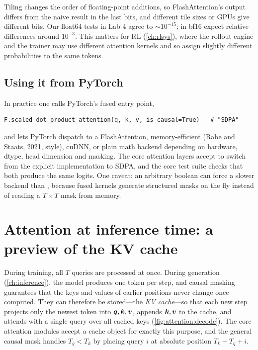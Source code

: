 \begin{pitfall}
Tiling changes the order of floating-point additions, so FlashAttention's output differs from the
naive result in the last bits, and different tile sizes or GPUs give different bits. Our float64
tests in Lab 4 agree to $\sim10^{-15}$; in bf16 expect relative differences around $10^{-3}$. This
matters for RL (\cref{ch:rlsys}), where the rollout engine and the trainer may use different
attention kernels and so assign slightly different probabilities to the same tokens.
\end{pitfall}

\subsection{Using it from PyTorch}
In practice one calls PyTorch's fused entry point,
\begin{lstlisting}[numbers=none]
F.scaled_dot_product_attention(q, k, v, is_causal=True)   # "SDPA"
\end{lstlisting}
\noindent and lets PyTorch dispatch to a FlashAttention, memory-efficient
(Rabe and Staats, 2021, style), cuDNN, or plain math backend depending on hardware, dtype, head
dimension and masking. The core  attention layers accept  to switch
from the explicit implementation to SDPA, and the core test suite checks that both produce the same
logits. One caveat: an arbitrary boolean  can force a slower backend than
, because fused kernels generate structured masks on the fly instead of reading
a $T\times T$ mask from memory.


\section{Attention at inference time: a preview of the KV cache}\label{sec:attention:decode}

During training, all $T$ queries are processed at once. During generation (\cref{ch:inference}),
the model produces one token per step, and causal masking guarantees that the keys and values of
earlier positions never change once computed. They can therefore be stored---the \emph{KV
cache}---so that each new step projects only the newest token into $\bm{q},\bm{k},\bm{v}$,
appends $\bm{k},\bm{v}$ to the cache, and attends with a single query over all cached keys
(\cref{fig:attention:decode}). The core  attention modules accept a cache object for
exactly this purpose, and the general causal mask 
handles $T_q<T_k$ by placing query $i$ at absolute position $T_k-T_q+i$.

